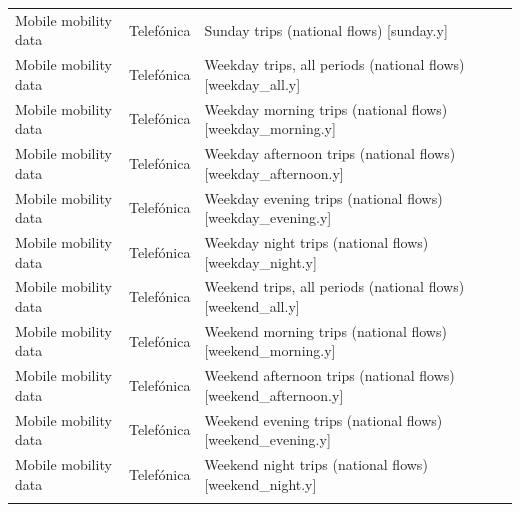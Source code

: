 \documentclass[10pt,a4paper]{article}
\begin{document}
\begin{longtable}{@{}>{\raggedright\arraybackslash}p{3.5cm}>{\raggedright\arraybackslash}p{5.6cm}>{\raggedright\arraybackslash}p{\dimexpr\textwidth-9.1cm-4\tabcolsep\relax}@{}}
Mobile mobility data & Telef\'{o}nica & Sunday trips (national flows) [sunday.y]\\
Mobile mobility data & Telef\'{o}nica & Weekday trips, all periods (national flows) [weekday\_all.y]\\
Mobile mobility data & Telef\'{o}nica & Weekday morning trips (national flows) [weekday\_morning.y]\\
Mobile mobility data & Telef\'{o}nica & Weekday afternoon trips (national flows) [weekday\_afternoon.y]\\
Mobile mobility data & Telef\'{o}nica & Weekday evening trips (national flows) [weekday\_evening.y]\\
Mobile mobility data & Telef\'{o}nica & Weekday night trips (national flows) [weekday\_night.y]\\
Mobile mobility data & Telef\'{o}nica & Weekend trips, all periods (national flows) [weekend\_all.y]\\
Mobile mobility data & Telef\'{o}nica & Weekend morning trips (national flows) [weekend\_morning.y]\\
Mobile mobility data & Telef\'{o}nica & Weekend afternoon trips (national flows) [weekend\_afternoon.y]\\
Mobile mobility data & Telef\'{o}nica & Weekend evening trips (national flows) [weekend\_evening.y]\\
Mobile mobility data & Telef\'{o}nica & Weekend night trips (national flows) [weekend\_night.y]\\*

\end{longtable}
\endgroup
\end{document}
